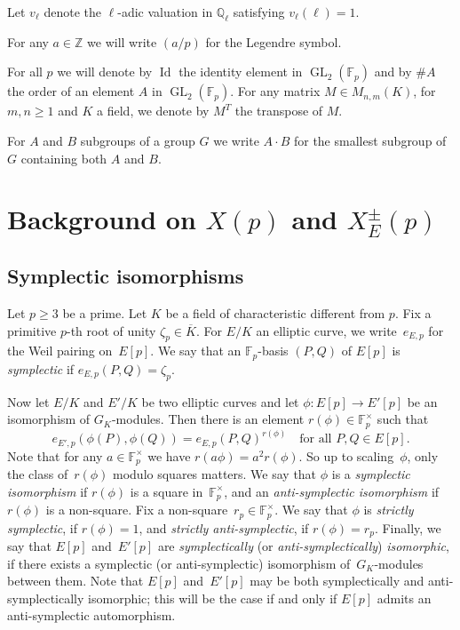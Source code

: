\documentclass[12pt]{amsart}
\numberwithin{equation}{section}
\theoremstyle{definition}
\newcommand{\F}{\mathbb{F}}
\newcommand{\Q}{\mathbb{Q}}
\newcommand{\Z}{\mathbb{Z}}
\DeclareMathOperator{\GL}{GL}
\DeclareMathOperator{\Id}{Id}
\begin{document}
Let $v_\ell$ denote the $\ell$-adic valuation in $\Q_\ell$ satisfying $v_\ell(\ell)=1$.

For any $a \in \Z$ we will write $(a/p)$ for the Legendre symbol.

For all $p$ we will denote by $\Id$ the identity element in $\GL_2(\F_p)$ and by $\# A$ the order of an element $A$ in $\GL_2(\F_p)$. For any matrix $M\in M_{n,m}(K)$, for $m,n\geq 1$ and $K$ a field, we denote by $M^T$ the transpose of $M$.

For $A$ and $B$ subgroups of a group $G$ we write $A \cdot B$ for the smallest subgroup of $G$ containing both $A$ and $B$.

\section{Background on \texorpdfstring{$X(p)$}{} and \texorpdfstring{$X_E^\pm (p)$}{}}
\label{sec:background}

\subsection{Symplectic isomorphisms}
Let $p \geq 3$ be a prime. Let $K$ be a field of characteristic different from $p$.
Fix a primitive $p$-th root of unity $\zeta_p \in \overline{K}$.
For $E/K$ an elliptic curve, we write~$e_{E,p}$ for the Weil pairing on~$E[p]$.
We say that an $\F_p$-basis $(P,Q)$ of $E[p]$ is \emph{symplectic} if
$e_{E,p}(P,Q) = \zeta_p$.

Now let $E /K$ and $E'/K$ be two elliptic curves and
let $\phi : E[p] \to E'[p]$ be an isomorphism of $G_K$-modules.
Then there is an element $r(\phi) \in \F_p^\times$ such that
\begin{equation}\label{eq:defr}
    e_{E',p}(\phi(P), \phi(Q)) = e_{E,p}(P, Q)^{r(\phi)} \quad \text{for all $P, Q \in E[p]$.} 
\end{equation}
Note that for any $a \in \F_p^\times$ we have $r(a\phi) = a^2 r(\phi)$.
So up to scaling~$\phi$, only the class of~$r(\phi)$ modulo squares matters.
We say that $\phi$ is a \textit{symplectic isomorphism} if
$r(\phi)$ is a square in~$\F_p^\times$, and an \textit{anti-symplectic isomorphism}
if $r(\phi)$ is a non-square.
Fix a non-square~$r_p \in \F_p^\times$.
We say that $\phi$ is \emph{strictly symplectic}, if $r(\phi) = 1$, and
\emph{strictly anti-symplectic}, if $r(\phi) = r_p$.
Finally, we say that $E[p]$ and~$E'[p]$ are
\emph{symplectically} (or \emph{anti-symplectically}) \emph{isomorphic},
if there exists a symplectic (or anti-symplectic) isomorphism of~$G_K$-modules between them.
Note that $E[p]$ and~$E'[p]$ may be both symplectically
and anti-symplectically isomorphic; this will be the case if and only if
$E[p]$ admits an anti-symplectic automorphism.
\end{document}
